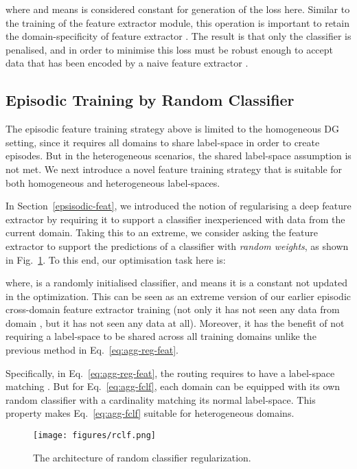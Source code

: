 \documentclass[10pt,twocolumn,letterpaper]{article}
\begin{document}
\noindent where  and   means  is considered constant for generation of the loss here. Similar to the training of the feature extractor module, this operation is important to retain the domain-specificity of feature extractor . The result is that only the classifier  is penalised, and in order to minimise this loss  must be robust enough to accept data  that has been encoded by a naive feature extractor . 



\subsection{Episodic Training by Random Classifier} 

The episodic feature training strategy above is limited to the homogeneous DG setting, since it requires all domains to share  label-space in order to create episodes. But in the heterogeneous scenarios, the shared label-space assumption is not met. We next introduce a novel feature training strategy that is suitable for both homogeneous and heterogeneous label-spaces. 

In Section~\ref{epsisodic-feat}, we introduced the notion of regularising a deep feature extractor by requiring it to support a classifier inexperienced with data from the current domain. Taking this to an extreme, we consider asking the feature extractor to support the predictions of a classifier with \emph{random weights}, as shown in Fig.~\ref{fig:agg-fclf}. To this end, our optimisation task here is:

\noindent where,  is a randomly initialised classifier, and  means it is a constant not updated in the optimization. This can be seen as an extreme version of our earlier episodic cross-domain feature extractor training (not only it has not seen any data from domain , but it has not seen any data at all). Moreover, it has the benefit of not requiring a label-space to be shared across all training domains unlike the previous method in Eq.~\ref{eq:agg-reg-feat}. 

Specifically, in Eq.~\ref{eq:agg-reg-feat}, the routing  requires  to have a label-space matching . But for Eq.~\ref{eq:agg-fclf}, each domain can be equipped with its own random classifier  with a cardinality matching its normal label-space. This property makes Eq.~\ref{eq:agg-fclf} suitable for heterogeneous domains.





\begin{figure}[tb]
    \centering
    \texttt{[image: figures/rclf.png]}
    \vspace{-0.4cm}
    \caption{\small The architecture of random classifier regularization.}
    \label{fig:agg-fclf}
        \vspace{-0.3cm}
\end{figure}
\end{document}
